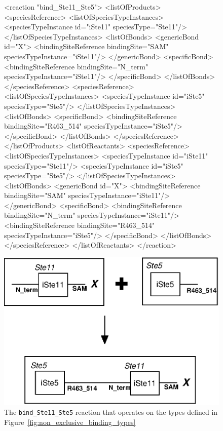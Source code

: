\documentclass{cekarticle}
\begin{document}
\begin{figure}[h]
\begin{example}
<reaction "bind_Ste11_Ste5">
    <listOfProducts>
        <speciesReference>
            <listOfSpeciesTypeInstances>
                <speciesTypeInstance id="iSte11" speciesType="Ste11"/>
            </listOfSpeciesTypeInstances>
            <listOfBonds>
                <genericBond id="X">
                    <bindingSiteReference bindingSite="SAM" speciesTypeInstance="iSte11"/>
                </genericBond>
                <specificBond>
                    <bindingSiteReference bindingSite="N_term" speciesTypeInstance="iSte11"/>
                </specificBond>
            </listOfBonds>
        </speciesReference>
        <speciesReference>
            <listOfSpeciesTypeInstances>
                <speciesTypeInstance id="iSte5" speciesType="Ste5"/>
            </listOfSpeciesTypeInstances>
            <listOfBonds>
                <specificBond>
                    <bindingSiteReference bindingSite="R463_514" speciesTypeInstance="iSte5"/>
                </specificBond>
            </listOfBonds>
        </speciesReference>
    </listOfProducts>
    <listOfReactants>
        <speciesReference>
            <listOfSpeciesTypeInstances>
                <speciesTypeInstance id="iSte11" speciesType="Ste11"/>
                <speciesTypeInstance id="iSte5" speciesType="Ste5"/>
            </listOfSpeciesTypeInstances>
            <listOfBonds>
                <genericBond id="X">
                    <bindingSiteReference bindingSite="SAM" speciesTypeInstance="iSte11"/>
                </genericBond>
                <specificBond>
                    <bindingSiteReference bindingSite="N_term" speciesTypeInstance="iSte11"/>
                    <bindingSiteReference bindingSite="R463_514" speciesTypeInstance="iSte5"/>
                </specificBond>
            </listOfBonds>
        </speciesReference>
    </listOfReactants>
</reaction>
\end{example}
  \vspace*{8pt}
  \centering
  \includegraphics[scale = 0.7]{bind_Ste11_Ste5.eps}
  \caption{The \texttt{bind\_Ste11\_Ste5} reaction that operates on the types defined in
  Figure~\ref{fig:non_exclusive_binding_types}}
  \label{fig:bind_Ste11_Ste5}
\end{figure}
\end{document}
